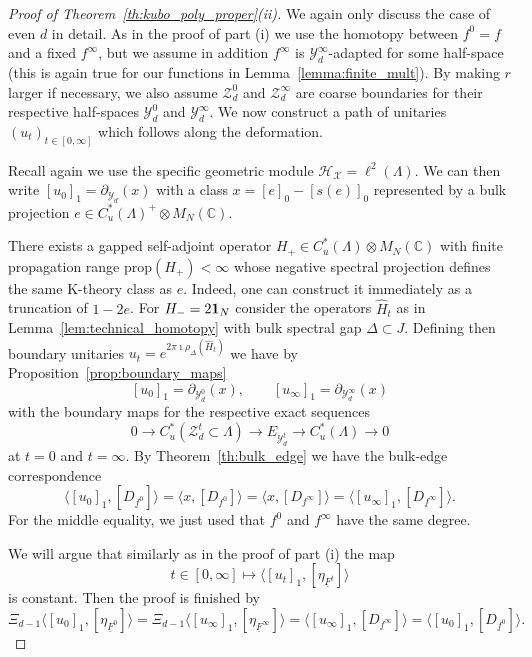\documentclass[12pt]{amsart}
\newcommand{\CM}{{\mathbb C}}
\newcommand{\Hh}{{\mathcal H}}
\newcommand{\Xx}{{\mathcal X}}
\newcommand{\Yy}{{\mathcal Y}}
\newcommand{\Zz}{{\mathcal Z}}
\newcommand{\one}{{\bf 1}}
\newcommand{\pdv}{\partial}
\newcommand{\scalarmatrix}{H_-}
\begin{document}
\begin{proof}[Proof of Theorem~\ref{th:kubo_poly_proper}(ii)]
We again only discuss the case of even $d$ in detail. As in the proof of part (i) we use the homotopy between $f^0=f$ and a fixed $f^\infty$, but we assume in addition $f^\infty$ is $\Yy_d^\infty$-adapted for some half-space (this is again true for our functions in Lemma~\ref{lemma:finite_mult}). By making $r$ larger if necessary, we also assume $\Zz_d^0$ and $\Zz_d^\infty$ are coarse boundaries for their respective half-spaces $\Yy_d^0$ and $\Yy_d^\infty$. We now construct a path of unitaries $(u_t)_{t\in [0,\infty]}$ which follows along the deformation.

Recall again we use the specific geometric module $\Hh_\Xx=\ell^2(\Lambda)$. We can then write $[u_0]_1 = \pdv_{{\Yy_d}}(x)$ with a class $x=[e]_0-[s(e)]_0$ represented by a bulk projection $e \in C^*_u(\Lambda)^+\otimes M_N(\CM)$.

There exists a gapped self-adjoint operator $H_+\in C^*_u(\Lambda)\otimes M_N(\CM)$ with finite propagation range $\mathrm{prop}(H_+)<\infty$ whose negative spectral projection defines the same K-theory class as $e$. Indeed, one can construct it immediately as a truncation of $1-2e$. For $\scalarmatrix=2\one_N$ consider the operators $\hat{H}_t$ as in Lemma~\ref{lem:technical_homotopy} with bulk spectral gap $\Delta\subset J$. Defining then boundary unitaries $u_{t}=e^{2\pi\imath \rho_\Delta(\hat{H}_t)}$ we have by Proposition~\ref{prop:boundary_maps}
$$[u_0]_1 = \pdv_{\Yy_d^0}(x), \qquad [u_\infty]_1 = \pdv_{\Yy_d^\infty}(x)$$
with the boundary maps for the respective exact sequences $$0\to C_u^*(\Zz_d^t\subset \Lambda) \to E_{\Yy_d^t} \to C_u^*(\Lambda) \to 0$$ 
at $t = 0$ and $t = \infty$. By Theorem~\ref{th:bulk_edge} we have the bulk-edge correspondence
\begin{equation}
\label{eq:index_doesnt_change}
\langle [u_0]_1, [D_{\underline{f}^{0}}]\rangle= \langle x, [D_{f^{0}}]\rangle=\langle x, [D_{f^{\infty}}]\rangle= \langle [u_\infty]_1, [D_{\underline{f}^{\infty}}]\rangle.
\end{equation}
For the middle equality, we just used that $f^{0}$ and $f^{\infty}$ have the same degree.

We will argue that similarly as in the proof of part (i) the map
$$t \in [0,\infty] \mapsto \langle [u_t]_1, [\eta_{\underline{F}^{t}}]\rangle$$
is constant. Then the proof is finished by
$$\Xi_{d-1} \langle [u_0]_1, [\eta_{\underline{F}^{0}}]\rangle = \Xi_{d-1} \langle [u_\infty]_1, [\eta_{\underline{F}^{\infty}}]\rangle = \langle[u_\infty]_1, [D_{\underline{f}^{\infty}}]\rangle = \langle [u_0]_1, [D_{\underline{f}^{0}}]\rangle.$$


\end{proof}
\end{document}
